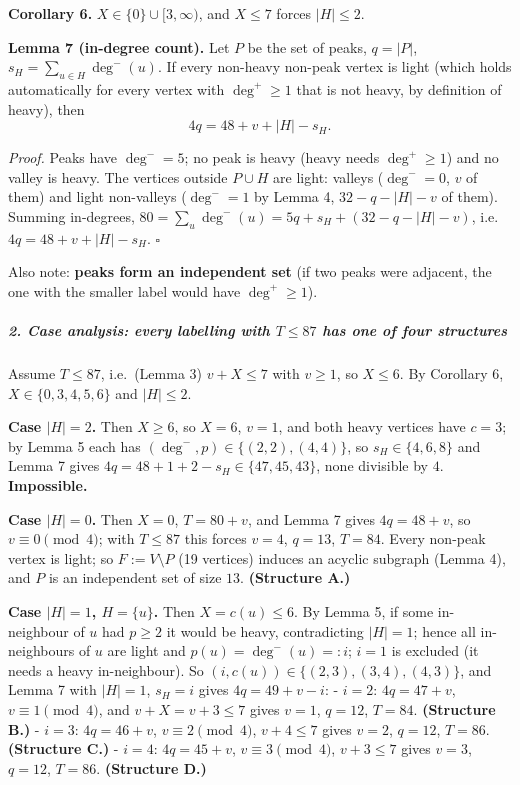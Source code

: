 \documentclass[11pt,a4paper]{article}
\begin{document}
\textbf{Corollary 6.} \(X\in\{0\}\cup[3,\infty)\), and \(X\le 7\) forces
\(|H|\le2\).

\textbf{Lemma 7 (in-degree count).} Let \(P\) be the set of peaks,
\(q=|P|\), \(s_H=\sum_{u\in H}\deg^-(u)\). If every non-heavy non-peak
vertex is light (which holds automatically for every vertex with
\(\deg^+\ge1\) that is not heavy, by definition of heavy), then
\[4q=48+v+|H|-s_H .\]

\emph{Proof.} Peaks have \(\deg^-=5\); no peak is heavy (heavy needs
\(\deg^+\ge1\)) and no valley is heavy. The vertices outside \(P\cup H\)
are light: valleys (\(\deg^-=0\), \(v\) of them) and light non-valleys
(\(\deg^-=1\) by Lemma 4, \(32-q-|H|-v\) of them). Summing in-degrees,
\(80=\sum_u\deg^-(u)=5q+s_H+(32-q-|H|-v)\), i.e.~\(4q=48+v+|H|-s_H\).
\(\square\)

Also note: \textbf{peaks form an independent set} (if two peaks were
adjacent, the one with the smaller label would have \(\deg^+\ge1\)).

\subparagraph{\texorpdfstring{2. Case analysis: every labelling with
\(T\le87\) has one of four
structures}{2. Case analysis: every labelling with T\textbackslash le87 has one of four structures}}\label{case-analysis-every-labelling-with-tle87-has-one-of-four-structures}

Assume \(T\le87\), i.e.~(Lemma 3) \(v+X\le7\) with \(v\ge1\), so
\(X\le6\). By Corollary 6, \(X\in\{0,3,4,5,6\}\) and \(|H|\le2\).

\textbf{Case \(|H|=2\).} Then \(X\ge6\), so \(X=6\), \(v=1\), and both
heavy vertices have \(c=3\); by Lemma 5 each has
\((\deg^-,p)\in\{(2,2),(4,4)\}\), so \(s_H\in\{4,6,8\}\) and Lemma 7
gives \(4q=48+1+2-s_H\in\{47,45,43\}\), none divisible by \(4\).
\textbf{Impossible.}

\textbf{Case \(|H|=0\).} Then \(X=0\), \(T=80+v\), and Lemma 7 gives
\(4q=48+v\), so \(v\equiv0\pmod 4\); with \(T\le87\) this forces
\(v=4\), \(q=13\), \(T=84\). Every non-peak vertex is light; so
\(F:=V\setminus P\) (19 vertices) induces an acyclic subgraph (Lemma 4),
and \(P\) is an independent set of size \(13\). \textbf{(Structure A.)}

\textbf{Case \(|H|=1\), \(H=\{u\}\).} Then \(X=c(u)\le6\). By Lemma 5,
if some in-neighbour of \(u\) had \(p\ge2\) it would be heavy,
contradicting \(|H|=1\); hence all in-neighbours of \(u\) are light and
\(p(u)=\deg^-(u)=:i\); \(i=1\) is excluded (it needs a heavy
in-neighbour). So \((i,c(u))\in\{(2,3),(3,4),(4,3)\}\), and Lemma 7 with
\(|H|=1\), \(s_H=i\) gives \(4q=49+v-i\): - \(i=2\): \(4q=47+v\),
\(v\equiv1\pmod4\), and \(v+X=v+3\le7\) gives \(v=1\), \(q=12\),
\(T=84\). \textbf{(Structure B.)} - \(i=3\): \(4q=46+v\),
\(v\equiv2\pmod4\), \(v+4\le7\) gives \(v=2\), \(q=12\), \(T=86\).
\textbf{(Structure C.)} - \(i=4\): \(4q=45+v\), \(v\equiv3\pmod4\),
\(v+3\le7\) gives \(v=3\), \(q=12\), \(T=86\). \textbf{(Structure D.)}
\end{document}
